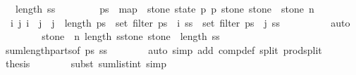 \begin{isabellebody}
\ {\isachardoublequoteopen}{\isachardot}{\isachardot}{\isachardot}\ {\isasymle}\ length\ {\isacharquery}ss{\isachardoublequoteclose}\isanewline
\ \ \isamarkupfalse%
{\isacharminus}\isanewline
\ \ \ \ \isamarkupfalse%
\ {\isacharquery}ps\ {\isacharequal}\ {\isachardoublequoteopen}map\ {\isacharparenleft}{\isasymlambda}\ stone{\isachardot}\ {\isacharparenleft}{\isasymlambda}{\isacharparenleft}state{\isacharcomma}\ p{}{\isacharcomma}\ p{}{\isacharcomma}\ stone{\isacharprime}{\isacharparenright}{\isachardot}\ stone{\isacharprime}\ {\isacharequal}\ stone{\isacharparenright}{\isacharparenright}\ {\isacharbrackleft}{}{\isachardot}{\isachardot}{\isacharless}n{\isacharbrackright}{\isachardoublequoteclose}\isanewline
\ \ \ \ \isamarkupfalse%
\ {\isachardoublequoteopen}{\isasymforall}\ i\ j{\isachardot}\ i\ {\isacharless}\ j\ {\isasymand}\ j\ {\isacharless}\ length\ {\isacharquery}ps\ {\isasymlongrightarrow}\ set\ {\isacharparenleft}filter\ {\isacharparenleft}{\isacharquery}ps\ {\isacharbang}\ i{\isacharparenright}\ {\isacharquery}ss{\isacharparenright}\ {\isasyminter}\ set\ {\isacharparenleft}filter\ {\isacharparenleft}{\isacharquery}ps\ {\isacharbang}\ j{\isacharparenright}\ {\isacharquery}ss{\isacharparenright}\ {\isacharequal}\ {\isacharbraceleft}{\isacharbraceright}{\isachardoublequoteclose}\isanewline
\ \ \ \ \ \ \isamarkupfalse%
\ auto\isanewline
\ \ \ \ \isamarkupfalse%
\ \isamarkupfalse%
\ {\isachardoublequoteopen}{\isacharparenleft}{\isasymSum}\ stone\ {\isasymleftarrow}\ {\isacharbrackleft}{}{\isachardot}{\isachardot}{\isacharless}n{\isacharbrackright}{\isachardot}\ length\ {\isacharparenleft}{\isacharquery}sstone\ stone{\isacharparenright}{\isacharparenright}\ {\isasymle}\ length\ {\isacharquery}ss{\isachardoublequoteclose}\ \isanewline
\ \ \ \ \ \ \isamarkupfalse%
\ sum{\isacharunderscore}length{\isacharunderscore}parts{\isacharbrackleft}of\ {\isacharquery}ps\ {\isacharquery}ss{\isacharbrackright}\isanewline
\ \ \ \ \ \ \isamarkupfalse%
\ {\isacharparenleft}auto\ simp\ add{\isacharcolon}\ comp{\isacharunderscore}def\ split{\isacharcolon}\ prod{\isachardot}split{\isacharparenright}\isanewline
\ \ \ \ \isamarkupfalse%
\ \isamarkupfalse%
\ {\isacharquery}thesis\isanewline
\ \ \ \ \ \ \isamarkupfalse%
\ {\isacharparenleft}subst\ sum{\isacharunderscore}list{\isacharunderscore}int{\isacharcomma}\ simp{\isacharparenright}\isanewline

\end{isabellebody}
